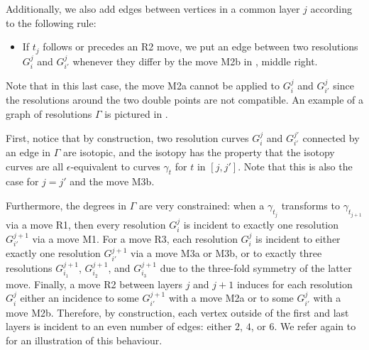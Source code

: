 \documentclass[10pt,a4paper]{amsart}
\begin{document}
Additionally, we also add edges between vertices in a common layer $j$ according to the following rule:

\begin{itemize}
\item If $t_j$ follows or precedes an R2 move, we put an edge between two resolutions $G^j_i$ and $G^{j}_{i'}$ whenever they differ by the move M2b in , middle right.
\end{itemize}

Note that in this last case, the move M2a cannot be applied to $G^j_i$ and $G^j_{i'}$ since the resolutions around the two double points are not compatible. An example of a graph of resolutions $\Gamma$ is pictured in .

First, notice that by construction, two resolution curves $G^j_i$ and $G^{j'}_{i'}$ connected by an edge in $\Gamma$ are isotopic, and the isotopy has the property that the isotopy curves are all $\epsilon$-equivalent to curves $\gamma_{t}$ for $t$ in $[j,j']$. Note that this is also the case for $j=j'$ and the move M3b.

Furthermore, the degrees in $\Gamma$ are very constrained: when a $\gamma_{t_j}$ transforms to $\gamma_{t_{j+1}}$ via a move R1, then every resolution $G^j_i$ is incident to exactly one resolution $G^{j+1}_{i'}$ via a move M1. For a move R3, each resolution $G^j_i$ is incident to either exactly one resolution $G^{j+1}_{i'}$ via a move M3a or M3b, or to exactly three resolutions $G^{j+1}_{i_1}$, $G^{j+1}_{i_2}$, and $G^{j+1}_{i_3}$ due to the three-fold symmetry of the latter move. Finally, a move R2 between layers $j$ and $j+1$ induces for each resolution $G^j_i$ either an incidence to some $G^{j+1}_{i'}$ with a move M2a or to some  $G^j_{i'}$ with a move M2b. Therefore, by construction, each vertex outside of the first and last layers is incident to an even number of edges: either $2$, $4$, or $6$. We refer again to  for an illustration of this behaviour.
\end{document}
